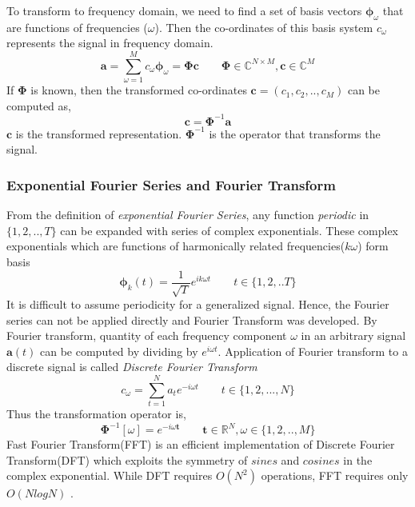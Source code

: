 \noindent To transform to frequency domain, we need to find a set of basis vectors $\bm{\phi}_{ \omega }$ that are functions of frequencies ($\omega$). Then the co-ordinates of this basis system $c_{ \omega }$ represents the signal in frequency domain. 
\begin{equation}
\label{exp_fourier}
\textbf{a} = \displaystyle\sum_{ \omega =1}^{M}c_{ \omega }\bm{\phi}_{ \omega } = \bm{\Phi}\textbf{c} \qquad \bm{\Phi} \in \mathbb{C}^{N \times M}, \textbf{c} \in \mathbb{C}^{M}
\end{equation}
If $\bm{\Phi}$ is known, then the transformed co-ordinates $\textbf{c} = (c_{1},c_{2},..,c_{M})$ can be computed as,
\[
\textbf{c} = \bm{\Phi}^{-1}\textbf{a}
\]
$\textbf{c}$ is the transformed representation. $\bm{\Phi}^{-1}$ is the operator that transforms the signal. 

\subsubsection{Exponential Fourier Series and Fourier Transform}
From the definition of \textit{exponential Fourier Series}, any function \textit{periodic} in $\{1,2,..,T\}$ can be expanded with series of complex exponentials\cite{allen}. These complex exponentials which are functions of harmonically related frequencies($k \omega$) form basis 
\[
\bm{\phi}_{k}(t) = \frac{1}{\sqrt{T}}e^{ik \omega t} \qquad t \in \{1,2,..T\}
\] 
It is difficult to assume periodicity for a generalized signal. Hence, the Fourier series can not be applied directly and Fourier Transform was developed. By Fourier transform, quantity of each frequency component $\omega$ in an arbitrary signal $\textbf{a}(t)$ can be computed by dividing by $e^{i \omega t}$. Application of Fourier transform to a discrete signal is called \textit{Discrete Fourier Transform}
\[
c_{\omega} =  \displaystyle\sum_{t=1}^{N}a_{t}e^{-i \omega t} \qquad t \in \{1,2,...,N\}
\] 
Thus the transformation operator is,
\[
\bm{\Phi}^{-1}[ \omega ] = e^{-i \omega \textbf{t}} \qquad \textbf{t} \in \mathbb{R}^{N}, \omega \in \{1,2,..,M\}
\]
Fast Fourier Transform(FFT) is an efficient implementation of Discrete Fourier Transform(DFT) which exploits the symmetry of $sines$ and $cosines$ in the complex exponential. While DFT requires $O(N^2)$ operations, FFT requires only $O(NlogN)$ \cite{allen}. 


